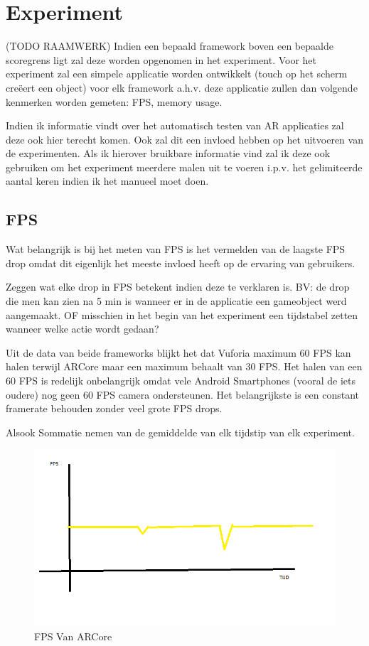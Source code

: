 \chapter{Experiment}
\label{ch:experiment}

(TODO RAAMWERK) Indien een bepaald framework boven een bepaalde scoregrens ligt zal deze worden opgenomen in het experiment.
Voor het experiment zal een simpele applicatie worden ontwikkelt (touch op het scherm creëert een object) voor elk framework a.h.v. deze applicatie zullen dan volgende kenmerken worden gemeten:  FPS, memory usage.

Indien ik informatie vindt over het automatisch testen van AR applicaties zal deze ook hier terecht komen. Ook zal dit een invloed hebben op het uitvoeren van de experimenten. Als ik hierover bruikbare informatie vind zal ik deze ook gebruiken om het experiment meerdere malen uit te voeren i.p.v. het gelimiteerde aantal keren indien ik het manueel moet doen.


\section{FPS}
Wat belangrijk is bij het meten van FPS is het vermelden van de laagste FPS drop omdat dit eigenlijk het meeste invloed heeft op de ervaring van gebruikers.

Zeggen wat elke drop in FPS betekent indien deze te verklaren is. BV: de drop die men kan zien na 5 min is wanneer er in de applicatie een gameobject werd aangemaakt. OF misschien in het begin van het experiment een tijdstabel zetten wanneer welke actie wordt gedaan?

Uit de data van beide frameworks blijkt het dat Vuforia maximum 60 FPS kan halen terwijl ARCore maar een maximum behaalt van 30 FPS. Het halen van een 60 FPS is redelijk onbelangrijk omdat vele Android Smartphones (vooral de iets oudere) nog geen 60 FPS camera ondersteunen. Het belangrijkste is een constant framerate behouden zonder veel grote FPS drops.

Alsook
Sommatie nemen van de gemiddelde van elk tijdstip van elk experiment.
\begin{figure}
    \includegraphics[width=\textwidth]{img/fpsgrafiek}\caption{FPS Van ARCore}\label{fig:fpsgr1}
\end{figure}

